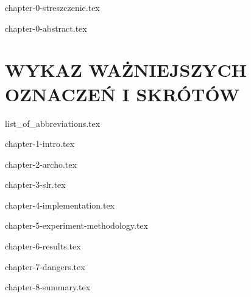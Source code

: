 \documentclass{szablonPG}
\begin{document}
\sloppy



\let\cleardoublepage\clearpage

{chapter-0-streszczenie.tex}

{chapter-0-abstract.tex}

\renewcommand{\contentsname}{SPIS TREŚCI}
\begingroup
\setlength{\parskip}{0pt}
\small
\tableofcontents
\endgroup

\chapter*{WYKAZ WAŻNIEJSZYCH OZNACZEŃ I SKRÓTÓW}
\label{chapter:abbreviations}
{list_of_abbreviations.tex}

\let\cleardoublepage\clearpage

{chapter-1-intro.tex}
\let\cleardoublepage\clearpage

{chapter-2-archo.tex}
\let\cleardoublepage\clearpage

{chapter-3-slr.tex}
\let\cleardoublepage\clearpage

{chapter-4-implementation.tex}
\let\cleardoublepage\clearpage

{chapter-5-experiment-methodology.tex}
\let\cleardoublepage\clearpage

{chapter-6-results.tex}
\let\cleardoublepage\clearpage

{chapter-7-dangers.tex}

\let\cleardoublepage\clearpage

{chapter-8-summary.tex}

\let\cleardoublepage\clearpage

\printbibliography[title={Wykaz literatury}]

\renewcommand{\listfigurename}{Wykaz rysunków}
\listoffigures
{}

\renewcommand{\listtablename}{Wykaz tabel}
\listoftables
{}

\renewcommand{\listingscaption}{Listing}
\renewcommand{\listoflistingscaption}{Wykaz listingów}
\listoflistings
{}

\nocite{*}
\end{document}
